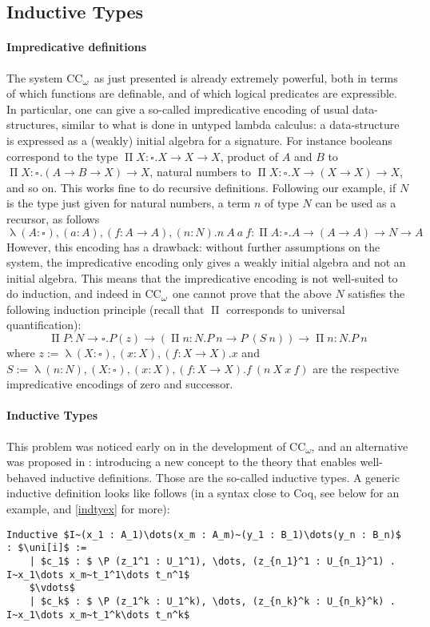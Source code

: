 \documentclass{kaobook}
\newcommand{\uni}[1][]{\square_{#1}}
\renewcommand{\P}{\operatorname{\Pi}}
\DeclareMathOperator{\?}{?}
\renewcommand{\l}{\operatorname{\lambda}}
\newcommand{\coc}{CC\textsubscript{$\omega$}}
\begin{document}
{\subsection{Inductive Types}
\label{induc}

\paragraph{Impredicative definitions}
The system \coc\ as just presented is already extremely powerful, both in terms of which functions are definable, and of which logical predicates are expressible.
In particular, one can give a so-called impredicative encoding of usual data-structures, similar to what is done in untyped lambda calculus: a data-structure is expressed as a (weakly) initial algebra for a signature. For instance booleans correspond to the type $ \P X : \uni. X \to X \to X$, product of $A$ and $B$ to $ \P X : \uni . (A \to B \to X) \to X$, natural numbers to $ \P X : \uni . X \to (X \to X) \to X$, and so on. This works fine to do recursive definitions. Following our example, if $N$ is the type just given for natural numbers, a term $n$ of type $N$ can be used as a recursor, as follows
\[\l (A : \uni), (a : A), (f : A \to A), (n : N) . n~A~a~f :  \P A : \uni . A \to (A \to A) \to N \to A \]
However, this encoding has a drawback: without further assumptions on the system, the impredicative encoding only gives a weakly initial algebra and not an initial algebra. This means that the impredicative encoding is not well-suited to do induction, and indeed in \coc\ one cannot prove that the above $N$ satisfies the following induction principle (recall that $\P$ corresponds to universal quantification):
\[ \P P : N \to \uni. P(z) \to ( \P n : N. P~n \to P~(S~n)) \to  \P n : N. P~n \]
where $z := \l (X : \uni), (x : X), (f : X \to X) . x$ and $S := \l (n : N), (X : \uni), (x : X), (f : X \to X) . f~(n~X~x~f)$ are the respective impredicative encodings of zero and successor.

\paragraph{Inductive Types}
This problem was noticed early on in the development of \coc, and an alternative was proposed in \cite{Paulin-Mohring1993}: introducing a new concept to the theory that enables well-behaved inductive definitions. Those are the so-called inductive types. A generic inductive definition looks like follows (in a syntax close to Coq, see below for an example, and \autoref{indtyex} for more):
\begin{lstlisting}
Inductive $I~(x_1 : A_1)\dots(x_m : A_m)~(y_1 : B_1)\dots(y_n : B_n)$ : $\uni[i]$ :=
	| $c_1$ : $ \P (z_1^1 : U_1^1), \dots, (z_{n_1}^1 : U_{n_1}^1) . I~x_1\dots x_m~t_1^1\dots t_n^1$
	$\vdots$
	| $c_k$ : $ \P (z_1^k : U_1^k), \dots, (z_{n_k}^k : U_{n_k}^k) . I~x_1\dots x_m~t_1^k\dots t_n^k$
\end{lstlisting}

}
\end{document}
